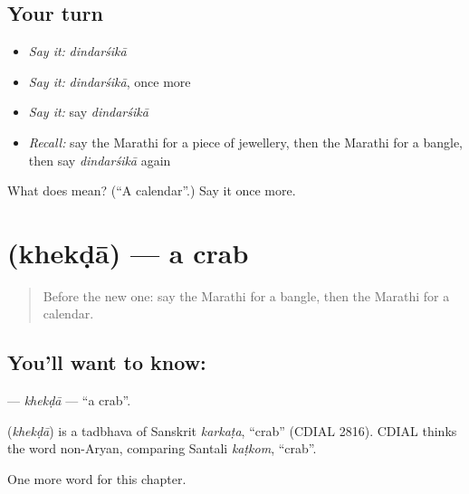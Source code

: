 \subsection*{Your turn}
\begin{itemize}
\raggedright
  \item \emph{Say it:} \emph{dindarśikā}
  \item \emph{Say it:} \emph{dindarśikā}, once more
  \item \emph{Say it:} say \emph{dindarśikā}
  \item \emph{Recall:} say the Marathi for a piece of jewellery, then the Marathi for a bangle, then say \emph{dindarśikā} again
\end{itemize}

\begin{tcolorbox}[breakable,colback=teal!4,colframe=teal!35!black,title={Before you move on}]
What does  mean? (\textquotedblleft{}A calendar\textquotedblright{}.) Say it once more.
\end{tcolorbox}
\section[\texorpdfstring{\mr{खेकडा} (khekḍā)}{खेकडा (khekḍā)}]{ (khekḍā) — a crab}

\label{lesson:MR-C188-khekda}



\begin{quote}
Before the new one: say the Marathi for a bangle, then the Marathi for a calendar.
\end{quote}

\subsection*{You'll want to know: }
\textbf{} — \emph{khekḍā} — \textquotedblleft{}a crab\textquotedblright{}.

\begin{cousinweb}
\textbf{} (\emph{khekḍā}) is a tadbhava of Sanskrit \emph{karkaṭa}, \textquotedblleft{}crab\textquotedblright{} (CDIAL 2816). CDIAL thinks the word non-Aryan, comparing Santali \emph{kaṭkom}, \textquotedblleft{}crab\textquotedblright{}.
\end{cousinweb}

\begin{grammarlens}[title={What you've built}]
One more word for this chapter.
\end{grammarlens}

